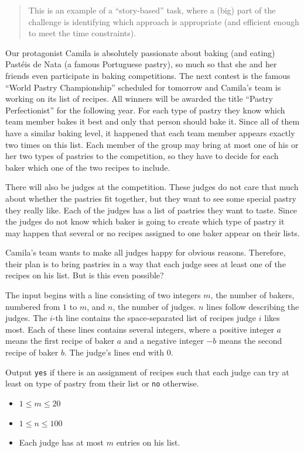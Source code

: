 
\begin{quote}
	This is an example of a \enquote{story-based} task, where a (big) part of the challenge is identifying which approach is appropriate (and efficient enough to meet the time constraints).
\end{quote}

Our protagonist Camila is absolutely passionate about baking (and eating) Pastéis de Nata (a famous Portuguese pastry), so much so that she and her friends even participate in baking competitions.
The next contest is the famous \enquote{World Pastry Championship} scheduled for tomorrow and Camila's team is working on its list of recipes.
All winners will be awarded the title \enquote{Pastry Perfectionist} for the following year.
For each type of pastry they know which team member bakes it best and only that person should bake it.
Since all of them have a similar baking level, it happened that each team member appears exactly two times on this list.
Each member of the group may bring at most one of his or her two types of pastries to the competition, so they have to decide for each baker which one of the two recipes to include.

There will also be judges at the competition.
These judges do not care that much about whether the pastries fit together, but they want to see some special pastry they really like.
Each of the judges has a list of pastries they want to taste.
Since the judges do not know which baker is going to create which type of pastry it may happen that several or no recipes assigned to one baker appear on their lists.

Camila's team wants to make all judges happy for obvious reasons.
Therefore, their plan is to bring pastries in a way that each judge sees at least one of the recipes on his list.
But is this even possible?

\begin{Input}
The input begins with a line consisting of two integers $m$, the number of bakers, numbered from $1$ to $m$, and $n$, the number of judges.
$n$ lines follow describing the judges.
The $i$-th line contains the space-separated list of recipes judge $i$ likes most.
Each of these lines contains several integers, where a positive integer $a$ means the first recipe of baker $a$ and a negative integer $-b$ means the second recipe of baker $b$.
The judge's lines end with $0$.
\end{Input}

\begin{Output}
Output \texttt{yes} if there is an assignment of recipes such that each judge can try at least on type of pastry from their list or \texttt{no} otherwise.
\end{Output}

\begin{Constraints}
\begin{itemize}
	\item $1\leq m\leq 20$
	\item $1\leq n\leq 100$
	\item Each judge has at most $m$ entries on his list.
\end{itemize}
\end{Constraints}
